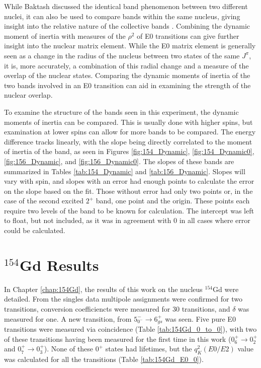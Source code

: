 While Baktash discussed the identical band phenomenon between two different nuclei, it can also be used to compare bands within the same nucleus, giving insight into the relative nature of the collective bands \citep{aprahamian18:_156gd}. Combining the dynamic moment of inertia with measures of the $\rho^2$ of E0 transitions can give further insight into the nuclear matrix element. While the E0 matrix element is generally seen as a change in the radius of the nucleus between two states of the same $J^{\pi}$, it is, more accurately, a combination of this radial change and a measure of the overlap of the nuclear states. Comparing the dynamic moments of inertia of the two bands involved in an E0 transition can aid in examining the strength of the nuclear overlap.

To examine the structure of the bands seen in this experiment, the dynamic moments of inertia can be compared. This is usually done with higher spins, but examination at lower spins can allow for more bands to be compared. The energy difference tracks linearly, with the slope being directly correlated to the moment of inertia of the band, as seen in Figures \ref{fig:154_Dynamic}, \ref{fig:154_Dynamic0}, \ref{fig:156_Dynamic}, and \ref{fig:156_Dynamic0}. The slopes of these bands are summarized in Tables \ref{tab:154_Dynamic} and \ref{tab:156_Dynamic}. Slopes will vary with spin, and slopes with an error had enough points to calculate the error on the slope based on the fit. Those without error had only two points or, in the case of the second excited $2^+$ band, one point and the origin. These points each require two levels of the band to be known for calculation. The intercept was left to float, but not included, as it was in agreement with 0 in all cases where error could be calculated.

\section{$^{154}$Gd Results}
\label{sec:154_Discussion}
In Chapter \ref{chap:154Gd}, the results of this work on the nucleus $^{154}$Gd were detailed. From the singles data multipole assignments were confirmed for two transitions, conversion coefficiencts were measured for 30 transitions, and $\delta$ was measured for one. A new transition, from $5^-_{0^-}\rightarrow 6^+_{gs}$ was seen. Five pure E0 transitions were measured via coincidence (Table \ref{tab:154Gd_0_to_0}), with two of these transitions having been measured for the first time in this work ($0^+_6\rightarrow 0^+_2$ and $0^+_7\rightarrow 0^+_3$). None of these $0^+$ states had lifetimes, but the $q_K^2(E0/E2)$ value was calculated for all the transitions (Table \ref{tab:154Gd_E0_0}).

